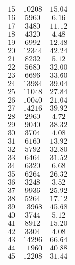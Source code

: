 \documentclass[10pt,a4paper]{article}
\begin{document}
\begin{enumerate}[1.]
\begin{center}
\begin{longtable}{|c|c|c|}
        $15$ & $10208$ & $15.04$\\ \hline 
        $16$ & $5960$ & $6.16$\\ \hline 
        $17$ & $3480$ & $11.12$\\ \hline 
        $18$ & $4320$ & $4.48$\\ \hline 
        $19$ & $6992$ & $12.48$\\ \hline 
        $20$ & $12344$ & $42.24$\\ \hline 
        $21$ & $8232$ & $5.12$\\ \hline 
        $22$ & $5680$ & $32.00$\\ \hline 
        $23$ & $6696$ & $33.60$\\ \hline 
        $24$ & $13984$ & $39.04$\\ \hline 
        $25$ & $11048$ & $27.84$\\ \hline 
        $26$ & $10040$ & $21.04$\\ \hline 
        $27$ & $14216$ & $39.92$\\ \hline 
        $28$ & $2960$ & $4.72$\\ \hline 
        $29$ & $9040$ & $38.32$\\ \hline 
        $30$ & $3704$ & $4.08$\\ \hline 
        $31$ & $6160$ & $13.92$\\ \hline 
        $32$ & $5792$ & $32.80$\\ \hline 
        $33$ & $6464$ & $31.52$\\ \hline 
        $34$ & $6320$ & $6.68$\\ \hline 
        $35$ & $6264$ & $26.32$\\ \hline 
        $36$ & $3248$ & $3.52$\\ \hline 
        $37$ & $9936$ & $25.92$\\ \hline 
        $38$ & $5264$ & $17.12$\\ \hline 
        $39$ & $13968$ & $45.68$\\ \hline 
        $40$ & $3744$ & $5.12$\\ \hline 
        $41$ & $8912$ & $15.20$\\ \hline 
        $42$ & $3304$ & $4.08$\\ \hline 
        $43$ & $14296$ & $66.64$\\ \hline 
        $44$ & $11960$ & $40.88$\\ \hline 
        $45$ & $12208$ & $31.44$\\ \hline 
    \end{longtable}

\end{center}
\end{enumerate}
\end{document}
